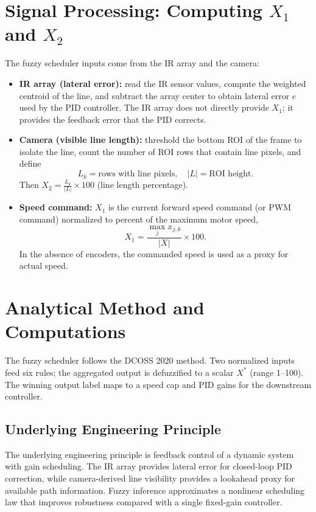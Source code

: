 \documentclass{article}
\begin{document}
\section{Signal Processing: Computing $X_1$ and $X_2$}
The fuzzy scheduler inputs come from the IR array and the camera:
\begin{itemize}
\item \textbf{IR array (lateral error):} read the IR sensor values, compute the weighted centroid of the line, and subtract the array center to obtain lateral error $e$ used by the PID controller. The IR array does not directly provide $X_1$; it provides the feedback error that the PID corrects.
\item \textbf{Camera (visible line length):} threshold the bottom ROI of the frame to isolate the line, count the number of ROI rows that contain line pixels, and define
\[
L_k = \text{rows with line pixels}, \quad |L| = \text{ROI height}.
\]
Then $X_2 = \frac{L_k}{|L|}\times 100$ (line length percentage).
\item \textbf{Speed command:} $X_1$ is the current forward speed command (or PWM command) normalized to percent of the maximum motor speed,
\[
X_1 = \frac{\max_j x_{j,k}}{|X|}\times 100.
\]
In the absence of encoders, the commanded speed is used as a proxy for actual speed.
\end{itemize}

\section{Analytical Method and Computations}
The fuzzy scheduler follows the DCOSS 2020 method. Two normalized inputs feed six rules; the aggregated output is defuzzified to a scalar $X^*$ (range 1--100). The winning output label maps to a speed cap and PID gains for the downstream controller.

\subsection*{Underlying Engineering Principle}
The underlying engineering principle is feedback control of a dynamic system with gain scheduling. The IR array provides lateral error for closed-loop PID correction, while camera-derived line visibility provides a lookahead proxy for available path information. Fuzzy inference approximates a nonlinear scheduling law that improves robustness compared with a single fixed-gain controller.
\end{document}
